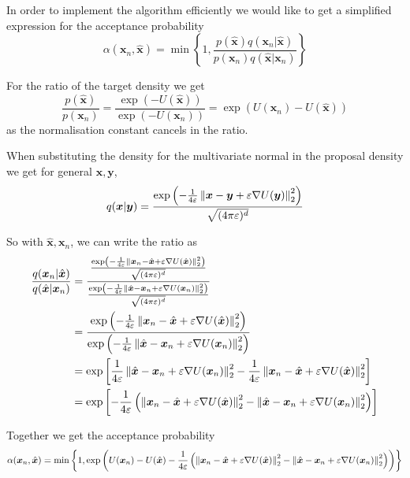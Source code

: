 In order to implement the algorithm efficiently we would like to get a simplified expression for the acceptance probability
\[
	\alpha( \bm{x}_n, \hat{\bm{x}} ) 
	= \min \left \{ 1, \frac
		{ p(\hat{\bm{x}}) q( \bm{x}_n | \hat{\bm{x}} )  } 
		{ p(\bm{x}_n) q( \hat{\bm{x}} | \bm{x}_n ) }
	\right\}
\]

For the ratio of the target density we get
\[
	\frac{ p(\hat{\bm{x}}) }{ p(\bm{x}_n) } = \frac{ \exp(-U(\hat{\bm{x}})) }{ \exp(-U(\bm{x}_n)) } = \exp( U(\bm{x}_n) - U(\hat{\bm{x}}) )
\]
as the normalisation constant cancels in the ratio.

When substituting the density for the multivariate normal in the proposal density we get for general $\bm{x}, \bm{y}$,
\[
	q(\bm{x} | \bm{y}) 
	= \frac
		{ \exp \left( -\frac{1}{4\varepsilon} \left\lVert\bm{x} - \bm{y} + \varepsilon \nabla U( \bm{y} ) \right\rVert_{2}^2 \right) }
		{ \sqrt{(4\pi \varepsilon)^d } }
\]

So with $\hat{\bm{x}}, \bm{x}_n$, we can write the ratio as
\[
\begin{aligned}
	\frac{ q(\bm{x}_n | \hat{\bm{x}}) }{ q(\hat{\bm{x}} | \bm{x}_n) }
	&= \frac
		{
			\frac
			{ \exp \left( -\frac{1}{4\varepsilon} \left\lVert\bm{x}_n - \hat{\bm{x}} + \varepsilon \nabla U( \hat{\bm{x}} ) \right\rVert_{2}^2 \right) }
			{ \sqrt{(4\pi \varepsilon)^d } }
		}
		{
			\frac
			{ \exp \left( -\frac{1}{4\varepsilon} \left\lVert\hat{\bm{x}} - \bm{x}_n + \varepsilon \nabla U( \bm{x}_n ) \right\rVert_{2}^2 \right) }
			{ \sqrt{(4\pi \varepsilon)^d } }
		} \\
	&= \frac
		{
			\exp \left( -\frac{1}{4\varepsilon}  \left\lVert\bm{x}_n - \hat{\bm{x}} + \varepsilon \nabla U( \hat{\bm{x}} ) \right\rVert_{2}^2\right)
		}
		{
			\exp \left( -\frac{1}{4\varepsilon} \left\lVert\hat{\bm{x}} - \bm{x}_n + \varepsilon \nabla U( \bm{x}_n ) \right\rVert_{2}^2 \right) 
		} \\
	&= \exp 
		\left[ 
			\frac{1}{4\varepsilon} \left\lVert\hat{\bm{x}} - \bm{x}_n + \varepsilon \nabla U( \bm{x}_n ) \right\rVert_{2}^2 
			-\frac{1}{4\varepsilon} \left\lVert\bm{x}_n - \hat{\bm{x}} + \varepsilon \nabla U( \hat{\bm{x}} ) \right\rVert_{2}^2 
		\right] \\
	&= \exp 
		\left[ 
			-\frac{1}{4\varepsilon} 
			\left( \left\lVert\bm{x}_n - \hat{\bm{x}} + \varepsilon \nabla U( \hat{\bm{x}} ) \right\rVert_{2}^2 - \left\lVert\hat{\bm{x}} - \bm{x}_n + \varepsilon \nabla U( \bm{x}_n ) \right\rVert_{2}^2  \right) 
		\right] \\
\end{aligned}
\]

Together we get the acceptance probability
\[
	\alpha( \bm{x}_n, \hat{\bm{x}} ) 
	= \min \left \{ 1, \exp \left(
		U(\bm{x}_n) - U(\hat{\bm{x}})
		-\frac{1}{4\varepsilon} 
		\left( \left\lVert\bm{x}_n - \hat{\bm{x}} + \varepsilon \nabla U( \hat{\bm{x}} ) \right\rVert_{2}^2 - \left\lVert\hat{\bm{x}} - \bm{x}_n + \varepsilon \nabla U( \bm{x}_n ) \right\rVert_{2}^2  \right)
		\right) 
	\right\}
\]


